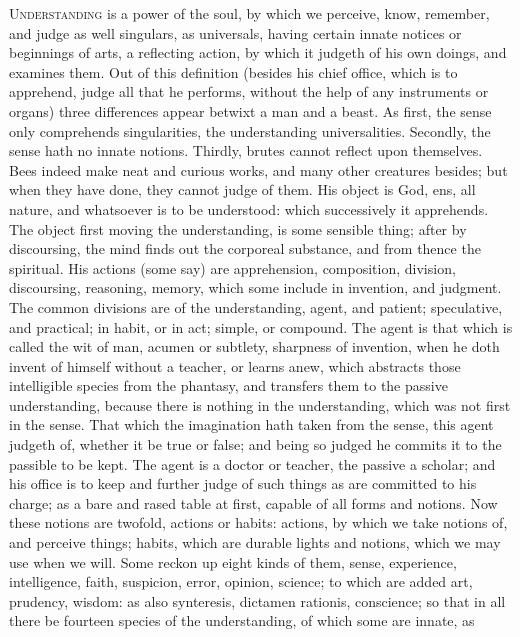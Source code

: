 {\lettrine{U}{nderstanding} is a power of the soul, by which we perceive, know,
remember, and judge as well singulars, as universals, having certain
innate notices or beginnings of arts, a reflecting action, by which it
judgeth of his own doings, and examines them. Out of this definition
(besides his chief office, which is to apprehend, judge all that he
performs, without the help of any instruments or organs) three
differences appear betwixt a man and a beast. As first, the sense only
comprehends singularities, the understanding universalities. Secondly,
the sense hath no innate notions. Thirdly, brutes cannot reflect upon
themselves. Bees indeed make neat and curious works, and many other
creatures besides; but when they have done, they cannot judge of them.
His object is God, ens, all nature, and whatsoever is to be understood:
which successively it apprehends. The object first moving the
understanding, is some sensible thing; after by discoursing, the mind
finds out the corporeal substance, and from thence the spiritual. His
actions (some say) are apprehension, composition, division,
discoursing, reasoning, memory, which some include in invention, and
judgment. The common divisions are of the understanding, agent, and
patient; speculative, and practical; in habit, or in act; simple, or
compound. The agent is that which is called the wit of man, acumen or
subtlety, sharpness of invention, when he doth invent of himself
without a teacher, or learns anew, which abstracts those intelligible
species from the phantasy, and transfers them to the passive
understanding,  because there is nothing in the understanding,
which was not first in the sense. That which the imagination hath taken
from the sense, this agent judgeth of, whether it be true or false; and
being so judged he commits it to the passible to be kept. The agent is
a doctor or teacher, the passive a scholar; and his office is to keep
and further judge of such things as are committed to his charge; as a
bare and rased table at first, capable of all forms and notions. Now
these notions are twofold, actions or habits: actions, by which we take
notions of, and perceive things; habits, which are durable lights and
notions, which we may use when we will. Some reckon up eight kinds of
them, sense, experience, intelligence, faith, suspicion, error,
opinion, science; to which are added art, prudency, wisdom: as also
synteresis, dictamen rationis, conscience; so that in all there
be fourteen species of the understanding, of which some are innate, as
}
